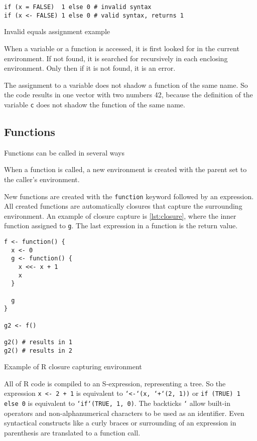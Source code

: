 \begin{listing}[h!]
	\centering
	\begin{verbatim}
if (x = FALSE)  1 else 0 # invalid syntax
if (x <- FALSE) 1 else 0 # valid syntax, returns 1
    \end{verbatim}
	\caption{Invalid equals assignment example}\label{lst:equals}
\end{listing}

When a variable or a function is accessed, it is first looked for in the current environment. If not found, it is searched for recursively in each enclosing environment. Only then if it is not found, it is an error.

The assignment to a variable does not shadow a function of the same name. So the code
results in one vector with two numbers 42, because the definition of the variable \texttt{c} does not shadow the function of the same name.

\subsection{Functions}

Functions can be called in several ways

When a function is called, a new environment is created with the parent set to the caller's environment.

New functions are created with the \texttt{function} keyword followed by an expression. All created functions are automatically closures that capture the surrounding environment. An example of closure capture is \ref{lst:closure}, where the inner function assigned to \texttt{g}. The last expression in a function is the return value.

\begin{listing}[h!]
	\centering
	\begin{verbatim}
f <- function() {
  x <- 0
  g <- function() {
    x <<- x + 1
    x
  }

  g
}

g2 <- f()

g2() # results in 1
g2() # results in 2
  \end{verbatim}
	\caption{Example of R closure capturing environment}\label{lst:closure}
\end{listing}

All of R code is compiled to an S-expression\todocite, representing a tree. So the expression \texttt{x <- 2 + 1} is equivalent to \texttt{`<-`(x, `+`(2, 1))} or \texttt{if (TRUE) 1 else 0} is equivalent to \texttt{`if`(TRUE, 1, 0)}. The backticks \texttt{`} allow built-in operators and non-alphanumerical characters to be used as an identifier. Even syntactical constructs like a curly braces or surrounding of an expression in parenthesis are translated to a function call.


